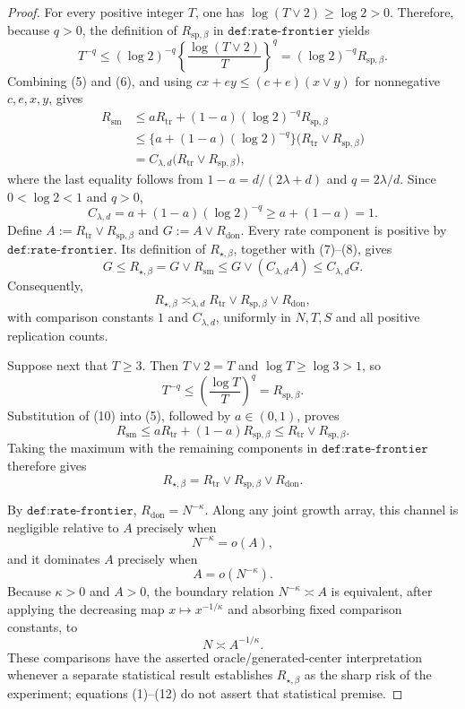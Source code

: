 \documentclass{article}
\begin{document}
\begin{proof}
For every positive integer \(T\), one has \(\log(T\vee2)\geq\log2>0\).  Therefore, because \(q>0\), the definition of \(R_{\mathrm{sp},\beta}\) in \(\texttt{def:rate-frontier}\) yields
\[
T^{-q}
\leq(\log2)^{-q}
\left\{\frac{\log(T\vee2)}{T}\right\}^{q}
=(\log2)^{-q}R_{\mathrm{sp},\beta}.
\tag{6}
\]
Combining (5) and (6), and using \(cx+ey\leq(c+e)(x\vee y)\) for nonnegative \(c,e,x,y\), gives
\[
\begin{aligned}
R_{\mathrm{sm}}
&\leq aR_{\mathrm{tr}}+(1-a)(\log2)^{-q}R_{\mathrm{sp},\beta}\\
&\leq\bigl\{a+(1-a)(\log2)^{-q}\bigr\}
\bigl(R_{\mathrm{tr}}\vee R_{\mathrm{sp},\beta}\bigr)\\
&=C_{\lambda,d}
\bigl(R_{\mathrm{tr}}\vee R_{\mathrm{sp},\beta}\bigr),
\end{aligned}
\tag{7}
\]
where the last equality follows from \(1-a=d/(2\lambda+d)\) and \(q=2\lambda/d\).  Since \(0<\log2<1\) and \(q>0\),
\[
C_{\lambda,d}=a+(1-a)(\log2)^{-q}
\geq a+(1-a)=1.
\tag{8}
\]
Define \(A:=R_{\mathrm{tr}}\vee R_{\mathrm{sp},\beta}\) and \(G:=A\vee R_{\mathrm{don}}\).  Every rate component is positive by \(\texttt{def:rate-frontier}\).  Its definition of \(R_{\star,\beta}\), together with (7)--(8), gives
\[
G
\leq R_{\star,\beta}
=G\vee R_{\mathrm{sm}}
\leq G\vee(C_{\lambda,d}A)
\leq C_{\lambda,d}G.
\tag{9}
\]
Consequently,
\[
R_{\star,\beta}
\asymp_{\lambda,d}
R_{\mathrm{tr}}\vee R_{\mathrm{sp},\beta}\vee R_{\mathrm{don}},
\]
with comparison constants \(1\) and \(C_{\lambda,d}\), uniformly in \(N,T,S\) and all positive replication counts.

Suppose next that \(T\geq3\).  Then \(T\vee2=T\) and \(\log T\geq\log3>1\), so
\[
T^{-q}
\leq\left(\frac{\log T}{T}\right)^q
=R_{\mathrm{sp},\beta}.
\tag{10}
\]
Substitution of (10) into (5), followed by \(a\in(0,1)\), proves
\[
R_{\mathrm{sm}}
\leq aR_{\mathrm{tr}}+(1-a)R_{\mathrm{sp},\beta}
\leq R_{\mathrm{tr}}\vee R_{\mathrm{sp},\beta}.
\tag{11}
\]
Taking the maximum with the remaining components in \(\texttt{def:rate-frontier}\) therefore gives
\[
R_{\star,\beta}
=R_{\mathrm{tr}}\vee R_{\mathrm{sp},\beta}\vee R_{\mathrm{don}}.
\tag{12}
\]

By \(\texttt{def:rate-frontier}\), \(R_{\mathrm{don}}=N^{-\kappa}\).  Along any joint growth array, this channel is negligible relative to \(A\) precisely when
\[
N^{-\kappa}=o(A),
\]
and it dominates \(A\) precisely when
\[
A=o(N^{-\kappa}).
\]
Because \(\kappa>0\) and \(A>0\), the boundary relation \(N^{-\kappa}\asymp A\) is equivalent, after applying the decreasing map \(x\mapsto x^{-1/\kappa}\) and absorbing fixed comparison constants, to
\[
N\asymp A^{-1/\kappa}.
\]
These comparisons have the asserted oracle/generated-center interpretation whenever a separate statistical result establishes \(R_{\star,\beta}\) as the sharp risk of the experiment; equations (1)--(12) do not assert that statistical premise.


\end{proof}
\end{document}
